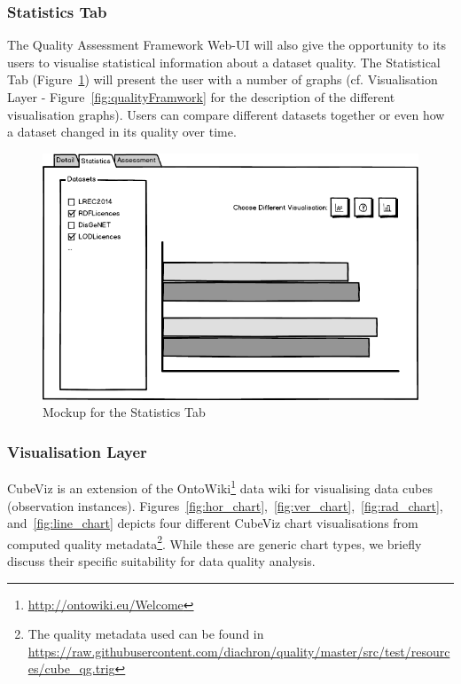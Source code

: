 \subsubsection{Statistics Tab}
The Quality Assessment Framework Web-UI will also give the opportunity to its users to visualise statistical information about a dataset quality.
The Statistical Tab (Figure~\ref{fig:uiStatisticsTab}) will present the user with a number of graphs (cf. Visualisation Layer - Figure~\ref{fig:qualityFramwork} for the description of the different visualisation graphs).
Users can compare different datasets together or even how a dataset changed in its quality over time.

\begin{figure}[tbph]
\center
\includegraphics[width=\textwidth]{images/uiStatisticsTab.png} 
\caption{Mockup for the Statistics Tab} 
\label{fig:uiStatisticsTab}
\end{figure}

\subsubsection{Visualisation Layer}
\label{sec:vislayer_hla}
CubeViz is an extension of the OntoWiki\footnote{\url{http://ontowiki.eu/Welcome}} data wiki for visualising data cubes (observation instances).
Figures~\ref{fig:hor_chart},~\ref{fig:ver_chart},~\ref{fig:rad_chart}, and~\ref{fig:line_chart} depicts four different CubeViz chart visualisations from computed quality metadata\footnote{The quality metadata used can be found in \url{https://raw.githubusercontent.com/diachron/quality/master/src/test/resources/cube_qg.trig}}.  While these are generic chart types, we briefly discuss their specific suitability for data quality analysis.

